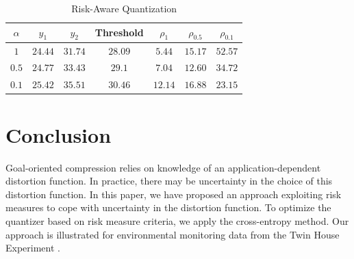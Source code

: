 \documentclass[conference]{IEEEtran}
\begin{document}
\begin{table}[h]
	\centering
	\caption{Risk-Aware Quantization}
	\begin{tabular}{|c|c|c|c|c|c|c|}
		\hline
		$\alpha$ & $y_1$ & $y_2$ & Threshold &  $\rho_1$ & $\rho_{0.5}$ &  $\rho_{0.1}$ \\
		\hline
		$1$ & $24.44$ & $31.74$ & $28.09$ & $\mathbf{5.44}$ & $15.17$ & $52.57$ \\
		\hline
		$0.5$ & $24.77$ & $33.43$ & $29.1$ & $7.04$ & $\mathbf{12.60}$ & $34.72$ \\
		\hline
		$0.1$ & $25.42$ & $35.51$ & $30.46$ & $12.14$ & $16.88$ & $\mathbf{23.15}$ \\
		\hline
	\end{tabular}
\label{table:Twin_house}
\end{table}

\section{Conclusion}

Goal-oriented compression relies on knowledge of an application-dependent distortion function. In practice, there may be uncertainty in the choice of this distortion function. In this paper, we have proposed an approach exploiting risk measures to cope with uncertainty in the distortion function. To optimize the quantizer based on risk measure criteria, we apply the cross-entropy method. Our approach is illustrated for environmental monitoring data from the Twin House Experiment \cite{Kersken2020}.




\end{document}

